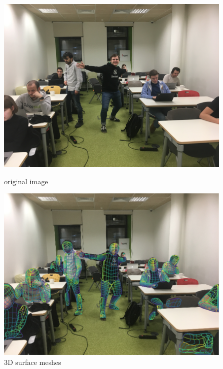 \begin{figure}[!tbp]
\centering
\begin{minipage}[b]{0.45\textwidth}
  \centering
  \includegraphics[width=\columnwidth]{Figures/orig_densepose}
  \caption{original image}
  \label{fig:orig}
\end{minipage}
\begin{minipage}[b]{0.45\textwidth}
  \centering
  \includegraphics[width=\columnwidth]{Figures/proc_densepose}
  \caption{3D surface meshes}
  \label{fig:proc}
\end{minipage}
\end{figure}



